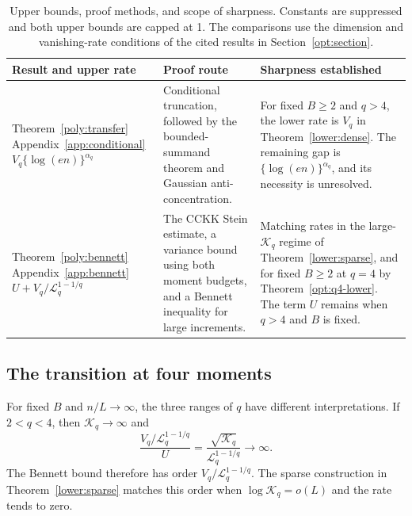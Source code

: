 \documentclass[11pt,letterpaper]{article}
\theoremstyle{remark}
\begin{document}
\begin{table}[htbp]
\centering
\small
\renewcommand{\arraystretch}{1.15}
\begin{tabularx}{\textwidth}{@{}>{\raggedright\arraybackslash}p{}
 >{\raggedright\arraybackslash}p{}
 >{\raggedright\arraybackslash}X@{}}
\toprule
Result and upper rate & Proof route & Sharpness established\\
\midrule
Theorem~\ref{poly:transfer}\newline
Appendix~\ref{app:conditional}\newline
\(V_q\{\log(en)\}^{\alpha_q}\)
& Conditional truncation, followed by the bounded-summand theorem and
Gaussian anti-concentration.
& For fixed \(B\ge2\) and \(q>4\), the lower rate is \(V_q\) in
Theorem~\ref{lower:dense}. The remaining gap is
\(\{\log(en)\}^{\alpha_q}\), and its necessity is unresolved.\\[0.6em]
Theorem~\ref{poly:bennett}\newline
Appendix~\ref{app:bennett}\newline
\(U+V_q/\mathcal{L}_q^{1-1/q}\)
& The CCKK Stein estimate, a variance bound using both moment budgets,
and a Bennett inequality for large increments.
& Matching rates in the large-\(\mathcal K_q\) regime of
Theorem~\ref{lower:sparse}, and for fixed \(B\ge2\) at \(q=4\)
by Theorem~\ref{opt:q4-lower}. The term \(U\) remains when \(q>4\)
and \(B\) is fixed.\\
\bottomrule
\end{tabularx}
\caption{Upper bounds, proof methods, and scope of sharpness.
Constants are suppressed and both upper bounds are capped at 1.
The comparisons use the dimension and vanishing-rate conditions of
the cited results in Section~\ref{opt:section}.}
\label{poly:summary}
\end{table}

\subsection{The transition at four moments}\label{poly:transition}

For fixed \(B\) and \(n/L\to\infty\), the three ranges of \(q\)
have different interpretations. If \(2<q<4\), then \(\mathcal K_q\to\infty\)
and
\[
 \frac{V_q/\mathcal{L}_q^{1-1/q}}{U}
   =\frac{\sqrt{\mathcal K_q}}{\mathcal{L}_q^{1-1/q}}\longrightarrow\infty.
\]
The Bennett bound therefore has order \(V_q/\mathcal{L}_q^{1-1/q}\).
The sparse construction in Theorem~\ref{lower:sparse} matches this
order when \(\log \mathcal K_q=o(L)\) and the rate tends to zero.
\end{document}
